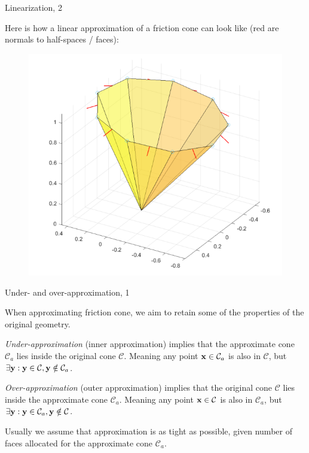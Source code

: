 \documentclass{beamer}
\begin{document}
\begin{frame}{Linearization, 2}
	\begin{flushleft}
		
		Here is how a linear approximation of a friction cone can look like (red are normals to half-spaces / faces):
		
		\begin{figure}
			\centering
			\includegraphics[width=0.7\linewidth]{approx}
			\label{fig:approx}
		\end{figure}
		
		
	\end{flushleft}
\end{frame}


\begin{frame}{Under- and over-approximation, 1}
	\begin{flushleft}
		
		When approximating friction cone, we aim to retain some of the properties of the original geometry. 
		
		\bigskip
		
		\emph{Under-approximation} (inner approximation) implies that the approximate cone $\mathcal{C}_a$ lies inside the original cone $\mathcal{C}$. Meaning any point  $\mathbf{x} \in \mathcal{C}_a$ is also in $\mathcal{C}$, but $\exists \mathbf{y}: \mathbf{y} \in \mathcal{C}, \mathbf{y} \notin \mathcal{C}_a$.
		
		\bigskip
		
		\emph{Over-approximation} (outer approximation) implies that the original cone $\mathcal{C}$ lies inside the approximate cone $\mathcal{C}_a$. Meaning any point  $\mathbf{x} \in \mathcal{C}$ is also in $\mathcal{C}_a$, but $\exists \mathbf{y}: \mathbf{y} \in \mathcal{C}_a, \mathbf{y} \notin \mathcal{C}$.
		
		\bigskip
		
		Usually we assume that approximation is as tight as possible, given number of faces allocated for the approximate cone $\mathcal{C}_a$.
		
	\end{flushleft}
\end{frame}
\end{document}
